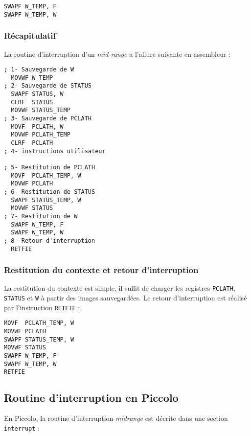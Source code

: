 \begin{lstlisting}[language=assembleur]
SWAPF W_TEMP, F
SWAPF W_TEMP, W
\end{lstlisting}





\subsubsection{Récapitulatif}

La routine d'interruption d'un \emph{mid-range} a l'allure suivante en assembleur :

\begin{lstlisting}[language=assembleur]
; 1- Sauvegarde de W
  MOVWF W_TEMP 
; 2- Sauvegarde de STATUS
  SWAPF STATUS, W
  CLRF  STATUS
  MOVWF STATUS_TEMP 
; 3- Sauvegarde de PCLATH
  MOVF  PCLATH, W
  MOVWF PCLATH_TEMP 
  CLRF  PCLATH
; 4- instructions utilisateur

; 5- Restitution de PCLATH
  MOVF  PCLATH_TEMP, W
  MOVWF PCLATH 
; 6- Restitution de STATUS
  SWAPF STATUS_TEMP, W
  MOVWF STATUS
; 7- Restitution de W
  SWAPF W_TEMP, F
  SWAPF W_TEMP, W
; 8- Retour d'interruption
  RETFIE
\end{lstlisting}





\subsubsection{Restitution du contexte et retour d'interruption}

La restitution du contexte est simple, il suffit de charger les registres \texttt{PCLATH}, \texttt{STATUS} et \texttt{W} à partir des images sauvegardées. Le retour d'interruption est réalisé par l'instruction \texttt{RETFIE} :

\begin{lstlisting}[language=assembleur]
MOVF  PCLATH_TEMP, W
MOVWF PCLATH 
SWAPF STATUS_TEMP, W
MOVWF STATUS
SWAPF W_TEMP, F
SWAPF W_TEMP, W
RETFIE
\end{lstlisting}



\subsection{Routine d'interruption en Piccolo}


En Piccolo, la routine d’interruption \emph{midrange} est décrite dans une section \texttt{interrupt} :

